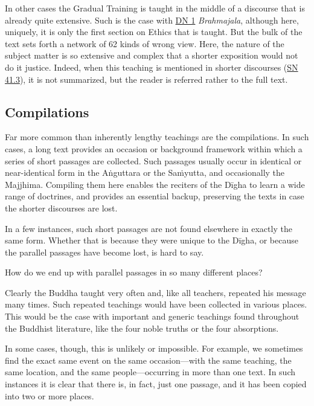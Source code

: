 \documentclass[12pt,openany]{book}%
\begin{document}
In other cases the Gradual Training is taught in the middle of a discourse that is already quite extensive. Such is the case with \href{https://suttacentral.net/dn1}{DN 1} \textit{Brahmajala}, although here, uniquely, it is only the first section on Ethics that is taught. But the bulk of the text sets forth a network of 62 kinds of wrong view. Here, the nature of the subject matter is so extensive and complex that a shorter exposition would not do it justice. Indeed, when this teaching is mentioned in shorter discourses (\href{https://suttacentral.net/sn41.3}{SN 41.3}), it is not summarized, but the reader is referred rather to the full text.

\subsection*{Compilations}

Far more common than inherently lengthy teachings are the compilations. In such cases, a long text provides an occasion or background framework within which a series of short passages are collected. Such passages usually occur in identical or near-identical form in the \textsanskrit{Aṅguttara} or the \textsanskrit{Saṁyutta}, and occasionally the Majjhima. Compiling them here enables the reciters of the \textsanskrit{Dīgha} to learn a wide range of doctrines, and provides an essential backup, preserving the texts in case the shorter discourses are lost.

In a few instances, such short passages are not found elsewhere in exactly the same form. Whether that is because they were unique to the \textsanskrit{Dīgha}, or because the parallel passages have become lost, is hard to say.

How do we end up with parallel passages in so many different places?

Clearly the Buddha taught very often and, like all teachers, repeated his message many times. Such repeated teachings would have been collected in various places. This would be the case with important and generic teachings found throughout the Buddhist literature, like the four noble truths or the four absorptions.

In some cases, though, this is unlikely or impossible. For example, we sometimes find the exact same event on the same occasion—with the same teaching, the same location, and the same people—occurring in more than one text. In such instances it is clear that there is, in fact, just one passage, and it has been copied into two or more places.
\end{document}
